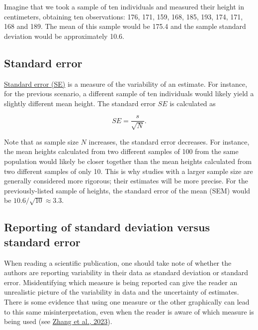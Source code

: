 \documentclass[letterpaper, 12pt]{article}
\begin{document}
Imagine that we took a sample of ten individuals and measured their height in centimeters, obtaining ten observations: 176, 171, 159, 168, 185, 193, 174, 171, 168 and 189. The mean of this sample would be 175.4 and the sample standard deviation would be approximately 10.6.

\subsection*{Standard error}

\href{https://en.wikipedia.org/wiki/Standard_error}{Standard error (SE)} is a measure of the variability of an estimate. For instance, for the previous scenario, a different sample of ten individuals would likely yield a slightly different mean height. The standard error $SE$ is calculated as

$$
SE = \frac{s}{\sqrt{N}}.
$$

Note that as sample size $N$ increases, the standard error decreases. For instance, the mean heights calculated from two different samples of 100 from the same population would likely be closer together than the mean heights calculated from two different samples of only 10. This is why studies with a larger sample size are generally considered more rigorous; their estimates will be more precise. For the previously-listed sample of heights, the standard error of the mean (SEM) would be $10.6/\sqrt{10} \approx 3.3$.

\subsection*{Reporting of standard deviation versus standard error}

When reading a scientific publication, one should take note of whether the authors are reporting variability in their data as standard deviation or standard error. Misidentifying which measure is being reported can give the reader an unrealistic picture of the variability in data and the uncertainty of estimates. There is some evidence that using one measure or the other graphically can lead to this same misinterpretation, even when the reader is aware of which measure is being used (see \href{https://doi.org/10.1073/pnas.2302491120}{Zhang et al., 2023}).
\end{document}
